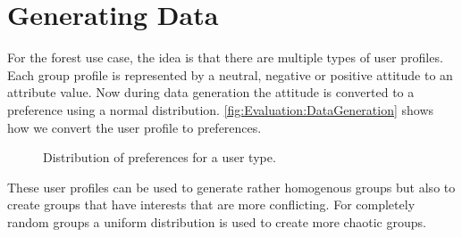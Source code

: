 \section{Generating Data}
\label{sec:Evaluation:GeneratingGroups}

For the forest use case, the idea is that there are multiple types of user profiles. Each group profile is represented by a neutral, negative or positive attitude to an attribute value. Now during data generation the attitude is converted to a preference using a normal distribution. \autoref{fig:Evaluation:DataGeneration} shows how we convert the user profile to preferences.

\pgfplotsset{height=5cm,width=\textwidth,compat=1.8}


\begin{figure}
 \caption{Distribution of preferences for a user type.}
\label{fig:Evaluation:DataGeneration}
\end{figure}

These user profiles can be used to generate rather homogenous groups but also to create groups that have interests that are more conflicting. For completely random groups a uniform distribution is used to create more chaotic groups.